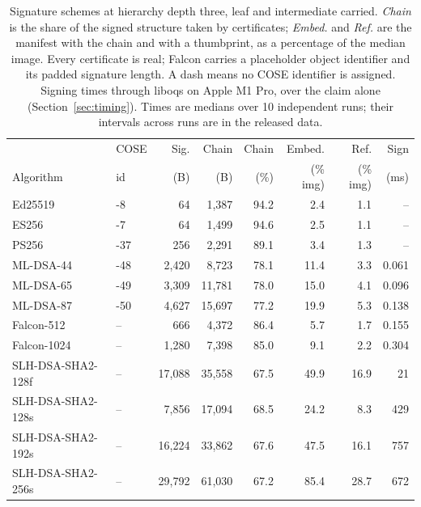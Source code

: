\begin{table}[t]
\caption{Signature schemes at hierarchy depth three, leaf and intermediate carried. \emph{Chain} is the share of the signed structure taken by certificates; \emph{Embed.} and \emph{Ref.} are the manifest with the chain and with a thumbprint, as a percentage of the median image. Every certificate is real; Falcon carries a placeholder object identifier and its padded signature length. A dash means no COSE identifier is assigned. Signing times through liboqs on Apple M1 Pro, over the claim alone (Section~\ref{sec:timing}). Times are medians over 10 independent runs; their intervals across runs are in the released data.}
\label{tab:algsweep}
\small
\setlength{\tabcolsep}{4pt}
\begin{tabular}{llrrrrrr}
\toprule
 & COSE & Sig. & Chain & Chain & Embed. & Ref. & Sign\\
Algorithm & id & (B) & (B) & (\%) & (\% img) & (\% img) & (ms)\\
\midrule
Ed25519 & -8 & 64 & 1,387 & 94.2 & 2.4 & 1.1 & --\\
ES256 & -7 & 64 & 1,499 & 94.6 & 2.5 & 1.1 & --\\
PS256 & -37 & 256 & 2,291 & 89.1 & 3.4 & 1.3 & --\\
\midrule
ML-DSA-44 & -48 & 2,420 & 8,723 & 78.1 & 11.4 & 3.3 & 0.061\\
ML-DSA-65 & -49 & 3,309 & 11,781 & 78.0 & 15.0 & 4.1 & 0.096\\
ML-DSA-87 & -50 & 4,627 & 15,697 & 77.2 & 19.9 & 5.3 & 0.138\\
Falcon-512 & -- & 666 & 4,372 & 86.4 & 5.7 & 1.7 & 0.155\\
Falcon-1024 & -- & 1,280 & 7,398 & 85.0 & 9.1 & 2.2 & 0.304\\
SLH-DSA-SHA2-128f & -- & 17,088 & 35,558 & 67.5 & 49.9 & 16.9 & 21\\
SLH-DSA-SHA2-128s & -- & 7,856 & 17,094 & 68.5 & 24.2 & 8.3 & 429\\
SLH-DSA-SHA2-192s & -- & 16,224 & 33,862 & 67.6 & 47.5 & 16.1 & 757\\
SLH-DSA-SHA2-256s & -- & 29,792 & 61,030 & 67.2 & 85.4 & 28.7 & 672\\
\bottomrule
\end{tabular}
\end{table}
